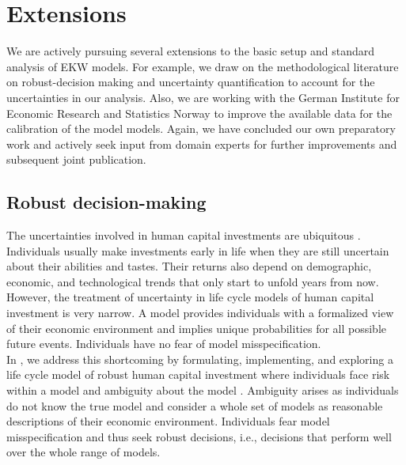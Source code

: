 \section{Extensions}\label{Extensions}
We are actively pursuing several extensions to the basic setup and standard analysis of EKW models. For example, we draw on the methodological literature on robust-decision making and uncertainty quantification to account for the uncertainties in our analysis. Also, we are working with the German Institute for Economic Research and Statistics Norway to improve the available data for the calibration of the model models. Again, we have concluded our own preparatory work and actively seek input from domain experts for further improvements and subsequent joint publication.
\subsection{Robust decision-making}
The uncertainties involved in human capital investments are ubiquitous \citep{Becker.1964}. Individuals usually make investments early in life when they are still uncertain about their abilities and tastes. Their returns also depend on demographic, economic, and technological trends that only start to unfold years from now. However, the treatment of uncertainty in life cycle models of human capital investment is very narrow. A model provides individuals with a formalized view of their economic environment and implies unique probabilities for all possible future events. Individuals have no fear of model misspecification.\\

\noindent In \citet{Eisenhauer.2020}, we address this shortcoming by formulating, implementing, and exploring a life cycle model of robust human capital investment where individuals face risk within a model and ambiguity about the model \citep{Arrow.1951}. Ambiguity arises as individuals do not know the true model and consider a whole set of models as reasonable descriptions of their economic environment. Individuals fear model misspecification and thus seek robust decisions, i.e., decisions that perform well over the whole range of models.\\

